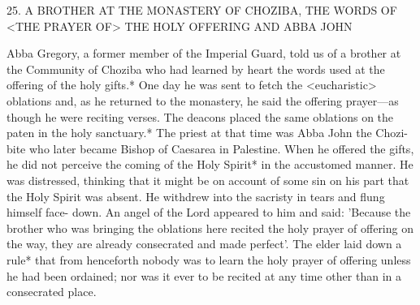 25. A BROTHER AT THE MONASTERY
OF CHOZIBA, THE WORDS OF
<THE PRAYER OF> THE HOLY OFFERING
AND ABBA JOHN

Abba Gregory, a former member of the Imperial Guard, told us of
a brother at the Community of Choziba who had learned by heart
the words used at the offering of the holy gifts.* One day he was
sent to fetch the <eucharistic> oblations and, as he returned to the
monastery, he said the offering prayer—as though he were reciting
verses. The deacons placed the same oblations on the paten in the
holy sanctuary.* The priest at that time was Abba John the Chozi-
bite who later became Bishop of Caesarea in Palestine. When he
offered the gifts, he did not perceive the coming of the Holy Spirit*
in the accustomed manner. He was distressed, thinking that it might
be on account of some sin on his part that the Holy Spirit was
absent. He withdrew into the sacristy in tears and flung himself face-
down. An angel of the Lord appeared to him and said: 'Because the
brother who was bringing the oblations here recited the holy prayer
of offering on the way, they are already consecrated and made
perfect'. The elder laid down a rule* that from henceforth nobody
was to learn the holy prayer of offering unless he had been
ordained; nor was it ever to be recited at any time other than in a
consecrated place.

